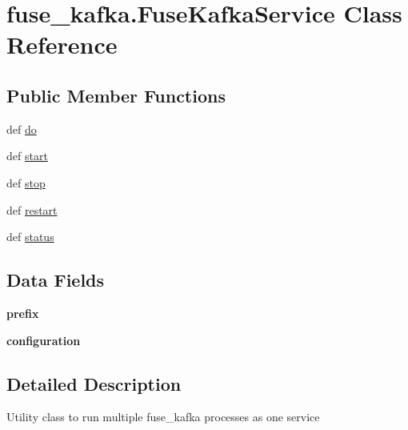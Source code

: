 \hypertarget{classfuse__kafka_1_1FuseKafkaService}{\section{fuse\-\_\-kafka.\-Fuse\-Kafka\-Service Class Reference}
\label{classfuse__kafka_1_1FuseKafkaService}
}
\subsection*{Public Member Functions}
\begin{DoxyCompactItemize}
\item 
def \hyperlink{classfuse__kafka_1_1FuseKafkaService_a08ccfab12ff2c998f5bc466de9c9afa4}{do}
\item 
def \hyperlink{classfuse__kafka_1_1FuseKafkaService_a2d8e0d317d293fa8f932e3e8882549f5}{start}
\item 
def \hyperlink{classfuse__kafka_1_1FuseKafkaService_ad17bb7d3209b7242defee5aa54ca828e}{stop}
\item 
def \hyperlink{classfuse__kafka_1_1FuseKafkaService_a7cc4774d8ed31ffe42ca2f955501ee45}{restart}
\item 
def \hyperlink{classfuse__kafka_1_1FuseKafkaService_a0289d64b6f56aef8b710466042ada3d1}{status}
\end{DoxyCompactItemize}
\subsection*{Data Fields}
\begin{DoxyCompactItemize}
\item 
\hypertarget{classfuse__kafka_1_1FuseKafkaService_ae104081d0b1ec3c4c44cfd4ccf75b01e}{{\bfseries prefix}}\label{classfuse__kafka_1_1FuseKafkaService_ae104081d0b1ec3c4c44cfd4ccf75b01e}

\item 
\hypertarget{classfuse__kafka_1_1FuseKafkaService_afd89f62981d0dcbb3efee6f56c949642}{{\bfseries configuration}}\label{classfuse__kafka_1_1FuseKafkaService_afd89f62981d0dcbb3efee6f56c949642}

\end{DoxyCompactItemize}


\subsection{Detailed Description}
\begin{DoxyVerb}Utility class to run multiple fuse_kafka processes as one service \end{DoxyVerb}
 

